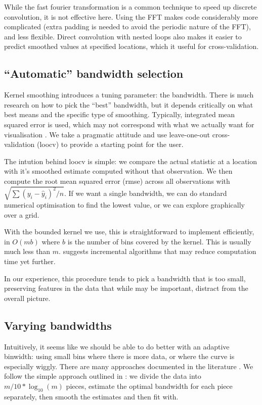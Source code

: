 \documentclass[journal]{vgtc}                %
\begin{document}
While the fast fourier transformation is a common technique to speed up discrete convolution, it is not effective here.  Using the FFT makes code considerably more complicated (extra padding is needed to avoid the periodic nature of the FFT), and less flexible. Direct convolution with nested loops also makes it easier to predict smoothed values at specified locations, which it useful for cross-validation.

\subsection{``Automatic'' bandwidth selection}

Kernel smoothing introduces a tuning parameter: the bandwidth. There is much research on how to pick the ``best'' bandwidth, but it depends critically on what best means and the specific type of smoothing. Typically, integrated mean squared error is used, which may not correspond with what we actually want for visualisation \citep{denby:2009}. We take a pragmatic attitude and use leave-one-out cross-validation (loocv) \citep{efron:1983} to provide a starting point for the user.

The intution behind loocv is simple: we compare the actual statistic at a location with it's smoothed estimate computed without that observation. We then compute the root mean squared error (rmse) across all observations with $\sqrt{ \sum (y_i - \hat{y}_i)^2 / n}$. If we want a single bandwidth, we can do standard numerical optimisation to find the lowest value, or we can explore graphically over a grid.

With the bounded kernel we use, this is straightforward to implement efficiently, in $O(m b)$ where $b$ is the number of bins covered by the kernel.  This is usually much less than $m$. \citep{fan:1994} suggests incremental algorithms that may reduce computation time yet further.

In our experience, this procedure tends to pick a bandwidth that is too small, preserving features in the data that while may be important, distract from the overall picture.

\subsection{Varying bandwidths}

Intuitively, it seems like we should be able to do better with an adaptive binwidth: using small bins where there is more data, or where the curve is especially wiggly. There are many approaches documented in the literature  \citep{terrell:1992, brockmann:1993,schucany:1995,herrmann:1997}.  We follow the simple approach outlined in \citep{fan:1995}: we divide the data into $m / 10 * \log_10(m)$ pieces, estimate the optimal bandwidth for each piece separately, then smooth the estimates and then fit with. 
\end{document}
